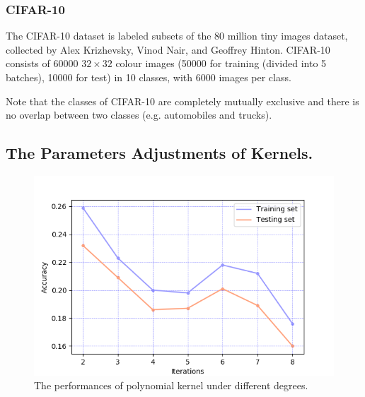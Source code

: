 \documentclass[12pt,a4paper]{article}
\theoremstyle{definition}
\begin{document}
\begin{appendix}
\subsubsection{CIFAR-10 \cite{cifar-10}}

The CIFAR-10 dataset is labeled subsets of the 80 million tiny images dataset, collected by Alex Krizhevsky, Vinod Nair, and Geoffrey Hinton. CIFAR-10 consists of 60000 $32 \times 32$ colour images (50000 for training (divided into 5 batches), 10000 for test) in 10 classes, with 6000 images per class.

\vspace{0.01\linewidth}
Note that the classes of CIFAR-10 are completely mutually exclusive and there is no overlap between two classes (e.g. automobiles and trucks).

\subsection{The Parameters Adjustments of Kernels.}
\label{apd:para-adj}

\begin{figure}[H]
	\centering
	\includegraphics[width=0.7\linewidth]{img/svm_poly_para.png}
	\caption{The performances of polynomial kernel under different degrees.}
	\label{fig:para-adj-poly}
\end{figure}


\end{appendix}



\end{document}

